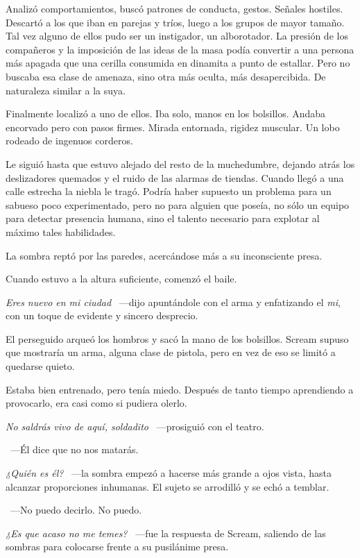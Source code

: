 Analizó comportamientos, buscó patrones de conducta, gestos. Señales hostiles. Descartó a los que iban en parejas y tríos, luego a los grupos de mayor tamaño. Tal vez alguno de ellos pudo ser un instigador, un alborotador. La presión de los compañeros y la imposición de las ideas de la masa podía convertir a una persona más apagada que una cerilla consumida en dinamita a punto de estallar. Pero no buscaba esa clase de amenaza, sino otra más oculta, más desapercibida. De naturaleza similar a la suya.

Finalmente localizó a uno de ellos. Iba solo, manos en los bolsillos. Andaba encorvado pero con pasos firmes. Mirada entornada, rigidez muscular. Un lobo rodeado de ingenuos corderos.

Le siguió hasta que estuvo alejado del resto de la muchedumbre, dejando atrás los deslizadores quemados y el ruido de las alarmas de tiendas. Cuando llegó a una calle estrecha la niebla le tragó. Podría haber supuesto un problema para un sabueso poco experimentado, pero no para alguien que poseía, no sólo un equipo para detectar presencia humana, sino el talento necesario para explotar al máximo tales habilidades.

La sombra reptó por las paredes, acercándose más a su inconsciente presa.

Cuando estuvo a la altura suficiente, comenzó el baile.

\emph{Eres nuevo en mi ciudad} ~---dijo apuntándole con el arma y enfatizando el \emph{mi}, con un toque de evidente y sincero desprecio.

El perseguido arqueó los hombros y sacó la mano de los bolsillos. Scream supuso que mostraría un arma, alguna clase de pistola, pero en vez de eso se limitó a quedarse quieto.

Estaba bien entrenado, pero tenía miedo. Después de tanto tiempo aprendiendo a provocarlo, era casi como si pudiera olerlo.

\emph{No saldrás vivo de aquí, soldadito} ~---prosiguió con el teatro.

~---Él dice que no nos matarás.

\emph{¿Quién es él?} ~---la sombra empezó a hacerse más grande a ojos vista, hasta alcanzar proporciones inhumanas. El sujeto se arrodilló y se echó a temblar.

~---No puedo decirlo. No puedo.

\emph{¿Es que acaso no me temes?} ~---fue la respuesta de Scream, saliendo de las sombras para colocarse frente a su pusilánime presa.


